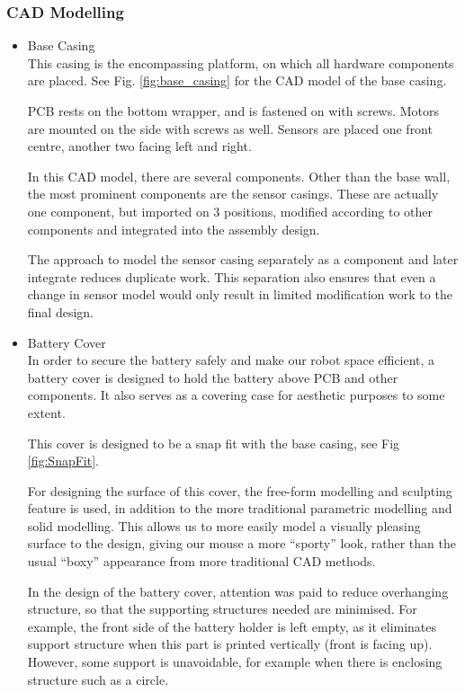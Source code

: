 \subsubsection{CAD Modelling}
\begin{itemize}
    \item Base Casing\\ 
    This casing is the encompassing platform, on which all hardware components are placed. See Fig. \ref{fig:base_casing} for the CAD model of the base casing.

    PCB rests on the bottom wrapper, and is fastened on with screws. Motors are mounted on the side with screws as well. Sensors are placed one front centre, another two facing left and right.

    In this CAD model, there are several components. Other than the base wall, the most prominent components are the sensor casings. These are actually one component, but imported on 3 positions, modified according to other components and integrated into the assembly design. 

    The approach to model the sensor casing separately as a component and later integrate reduces duplicate work. This separation also ensures that even a change in sensor model would only result in limited modification work to the final design.
    

    \item Battery Cover\\ 
    In order to secure the battery safely and make our robot space efficient, a battery cover is designed to hold the battery above PCB and other components. It also serves as a covering case for aesthetic purposes to some extent.

    This cover is designed to be a snap fit with the base casing, see Fig \ref{fig:SnapFit}.

    For designing the surface of this cover, the free-form modelling and sculpting feature is used, in addition to the more traditional parametric modelling and solid modelling. This allows us to more easily model a visually pleasing surface to the design, giving our mouse a more “sporty” look, rather than the usual “boxy” appearance from more traditional CAD methods.

    In the design of the battery cover, attention was paid to reduce overhanging structure, so that the supporting structures needed are minimised. For example, the front side of the battery holder is left empty, as it eliminates support structure when this part is printed vertically (front is facing up). However, some support is unavoidable, for example when there is enclosing structure such as a circle.

\end{itemize}


